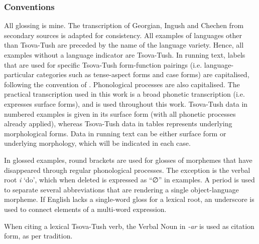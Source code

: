 \subsubsection{Conventions} \label{conventions}

All glossing is mine. The transcription of Georgian, Ingush and Chechen from secondary sources is adapted for consistency.
All examples of languages other than Tsova-Tush are preceded by the name of the language variety. Hence, all examples without a language indicator are Tsova-Tush.
In running text, labels that are used for specific Tsova-Tush form-function pairings (i.e. language-particular categories such as tense-aspect forms and case forms) are capitalised, following the convention of \textcite{comrie76}. Phonological processes are also capitalised.
The practical transcription used in this work is a broad phonetic transcription (i.e. expresses surface forms), and is used throughout this work. Tsova-Tush data in numbered examples is given in its surface form (with all phonetic processes already applied), whereas Tsova-Tush data in tables represents underlying morphological forms. Data in running text can be either surface form or underlying morphology, which will be indicated in each case.

In glossed examples, round brackets are used for glosses of morphemes that have disappeared through regular phonological processes. The exception is the verbal root \textit{i} `do', which when deleted is expressed as “∅” in examples. A period is used to separate several abbreviations that are rendering a single object-language morpheme. If English lacks a single-word gloss for a lexical root, an underscore is used to connect elements of a multi-word expression.

When citing a lexical Tsova-Tush verb, the Verbal Noun in \textit{-ar} is used as citation form, as per tradition.





